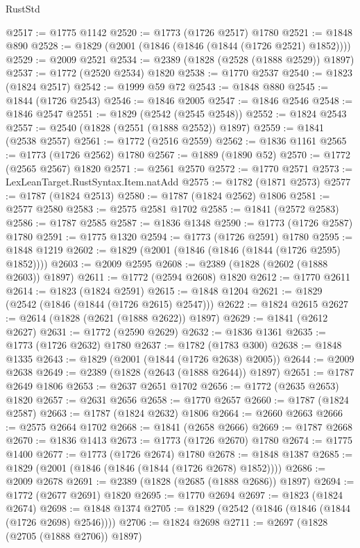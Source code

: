 \begin{lexlean}{RustStd}
\begin{coremodule}
@2517 := @1775 @1142
@2520 := @1773 (@1726 @2517) @1780
@2521 := @1848 @890
@2528 := @1829 (@2001 (@1846 (@1846 (@1844 (@1726 @2521) @1852))))
@2529 := @2009 @2521
@2534 := @2389 (@1828 (@2528 (@1888 @2529)) @1897)
@2537 := @1772 (@2520 @2534) @1820
@2538 := @1770 @2537
@2540 := @1823 (@1824 @2517)
@2542 := @1999 @59 @72
@2543 := @1848 @880
@2545 := @1844 (@1726 @2543)
@2546 := @1846 @2005
@2547 := @1846 @2546
@2548 := @1846 @2547
@2551 := @1829 (@2542 (@2545 @2548))
@2552 := @1824 @2543
@2557 := @2540 (@1828 (@2551 (@1888 @2552)) @1897)
@2559 := @1841 (@2538 @2557)
@2561 := @1772 (@2516 @2559)
@2562 := @1836 @1161
@2565 := @1773 (@1726 @2562) @1780
@2567 := @1889 (@1890 @52)
@2570 := @1772 (@2565 @2567) @1820
@2571 := @2561 @2570
@2572 := @1770 @2571
@2573 := LexLeanTarget.RustSyntax.Item.natAdd
@2575 := @1782 (@1871 @2573)
@2577 := @1787 (@1824 @2513)
@2580 := @1787 (@1824 @2562) @1806
@2581 := @2577 @2580
@2583 := @2575 @2581 @1702
@2585 := @1841 (@2572 @2583)
@2586 := @1787 @2585
@2587 := @1836 @1348
@2590 := @1773 (@1726 @2587) @1780
@2591 := @1775 @1320
@2594 := @1773 (@1726 @2591) @1780
@2595 := @1848 @1219
@2602 := @1829 (@2001 (@1846 (@1846 (@1844 (@1726 @2595) @1852))))
@2603 := @2009 @2595
@2608 := @2389 (@1828 (@2602 (@1888 @2603)) @1897)
@2611 := @1772 (@2594 @2608) @1820
@2612 := @1770 @2611
@2614 := @1823 (@1824 @2591)
@2615 := @1848 @1204
@2621 := @1829 (@2542 (@1846 (@1844 (@1726 @2615) @2547)))
@2622 := @1824 @2615
@2627 := @2614 (@1828 (@2621 (@1888 @2622)) @1897)
@2629 := @1841 (@2612 @2627)
@2631 := @1772 (@2590 @2629)
@2632 := @1836 @1361
@2635 := @1773 (@1726 @2632) @1780
@2637 := @1782 (@1783 @300)
@2638 := @1848 @1335
@2643 := @1829 (@2001 (@1844 (@1726 @2638) @2005))
@2644 := @2009 @2638
@2649 := @2389 (@1828 (@2643 (@1888 @2644)) @1897)
@2651 := @1787 @2649 @1806
@2653 := @2637 @2651 @1702
@2656 := @1772 (@2635 @2653) @1820
@2657 := @2631 @2656
@2658 := @1770 @2657
@2660 := @1787 (@1824 @2587)
@2663 := @1787 (@1824 @2632) @1806
@2664 := @2660 @2663
@2666 := @2575 @2664 @1702
@2668 := @1841 (@2658 @2666)
@2669 := @1787 @2668
@2670 := @1836 @1413
@2673 := @1773 (@1726 @2670) @1780
@2674 := @1775 @1400
@2677 := @1773 (@1726 @2674) @1780
@2678 := @1848 @1387
@2685 := @1829 (@2001 (@1846 (@1846 (@1844 (@1726 @2678) @1852))))
@2686 := @2009 @2678
@2691 := @2389 (@1828 (@2685 (@1888 @2686)) @1897)
@2694 := @1772 (@2677 @2691) @1820
@2695 := @1770 @2694
@2697 := @1823 (@1824 @2674)
@2698 := @1848 @1374
@2705 := @1829 (@2542 (@1846 (@1846 (@1844 (@1726 @2698) @2546))))
@2706 := @1824 @2698
@2711 := @2697 (@1828 (@2705 (@1888 @2706)) @1897)

\end{coremodule}
\end{lexlean}
